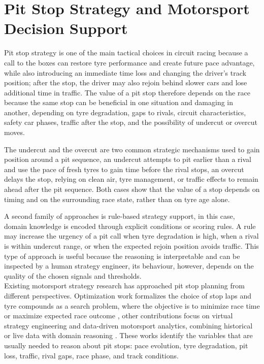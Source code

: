 \section{Pit Stop Strategy and Motorsport Decision Support}

Pit stop strategy is one of the main tactical choices in circuit racing because a call to the boxes can restore tyre performance and create future
pace advantage, while also introducing an immediate time loss and changing the driver's track position; after the stop, the driver may also rejoin behind slower cars and
lose additional time in traffic. The value of a pit stop therefore depends on the race because
the same stop can be beneficial in one situation and damaging in another, depending on tyre degradation, gaps to rivals, circuit characteristics,
safety car phases, traffic after the stop, and the possibility of undercut or overcut moves.

The undercut and the overcut are two common strategic mechanisms used to gain position around a pit sequence, an undercut attempts to pit earlier than a rival and use
the pace of fresh tyres to gain time before the rival stops, an overcut delays the stop, relying on clean air, tyre management, or traffic effects to remain ahead after
the pit sequence. Both cases show that the value of a stop depends on timing and on the surrounding race state, rather than on tyre age alone.

A second family of approaches is rule-based strategy support, in this case, domain knowledge is encoded through explicit conditions or scoring rules. A rule may increase
the urgency of a pit call when tyre degradation is high, when a rival is within undercut range, or when the expected rejoin position avoids traffic. This type of approach is
useful because the reasoning is interpretable and can be inspected by a human strategy engineer, its behaviour, however, depends on the quality of the chosen signals and
thresholds.\\
Existing motorsport strategy research has approached pit stop planning from different perspectives. Optimization work formalizes the choice of stop laps and tyre
compounds as a search problem, where the objective is to minimize race time or maximize expected race outcome
\citep{carrasco2023optimization,quiroga2024optimization,piccinotti2020openloop}, other contributions focus on virtual strategy engineering and data-driven motorsport
analytics, combining historical or live data with domain reasoning \citep{heilmeier2020race,widanage2019indy500}. These works identify the variables that are usually
needed to reason about pit stops: pace evolution, tyre degradation, pit loss, traffic, rival gaps, race phase, and track conditions.

